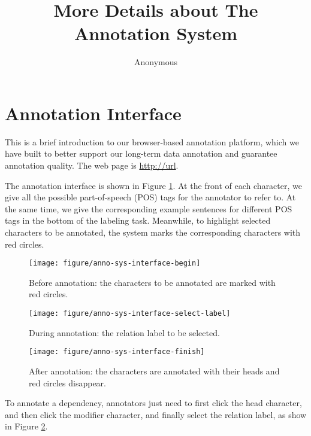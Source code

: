 \documentclass[a4paper]{article}
\title{More Details about The Annotation System}
\author{ Anonymous 
}
\date{}
\begin{document}
\fontsize{12}{15}
\selectfont
\maketitle

\section{Annotation Interface}

This is a brief introduction to our browser-based annotation platform, 
which we have built to better support our long-term data annotation and guarantee annotation quality. %
The web page is \url{http://url}.

The annotation interface is shown in Figure \ref{fig:anno-sys-interface-begin}. 
At the front of each character, we give all the possible part-of-speech (POS) tags for the annotator to refer to. At the same time, we give the corresponding example sentences for different POS tags in the bottom of the labeling task. Meanwhile, to highlight selected characters to be annotated, the system marks the corresponding characters with red circles.

\begin{figure}[hptb]
\centering
\texttt{[image: figure/anno-sys-interface-begin]}
\caption{
Before annotation: the characters to be annotated are marked with red circles.
}
\label{fig:anno-sys-interface-begin}
\end{figure}

\begin{figure}[hptb]
\centering
\texttt{[image: figure/anno-sys-interface-select-label]}
\caption{
During annotation: the relation label to be selected.
}
\label{fig:anno-sys-interface-select-label}
\end{figure}

\begin{figure}[hptb]
\centering
\texttt{[image: figure/anno-sys-interface-finish]}
\caption{
After annotation: the characters are annotated with their heads and red circles disappear.
}
\label{fig:anno-sys-interface-finish}
\end{figure}

To annotate a dependency, annotators just need to first click the head character, and then click the modifier character, and finally select the relation label, as show in Figure \ref{fig:anno-sys-interface-select-label}.
\end{document}
